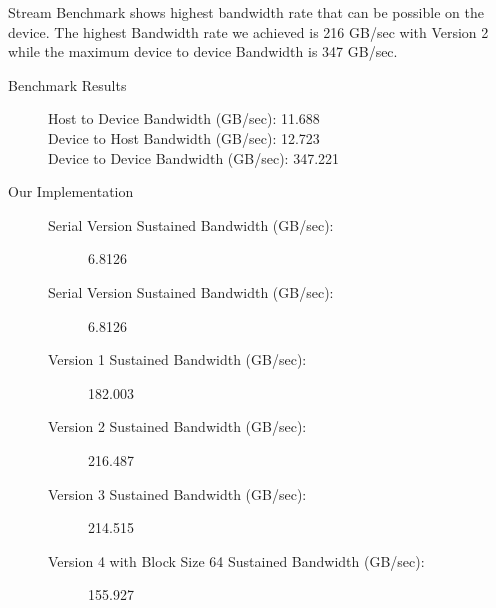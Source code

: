 \documentclass{article}
\newcommand\tab[1][0.5cm]{\hspace*{#1}}
\begin{document}
\tab Stream Benchmark shows highest bandwidth rate that can be possible on the device. 
The highest Bandwidth rate we achieved is 216 GB/sec with Version 2 while the maximum device to device Bandwidth is 347 GB/sec. 

\begin{description}
  \item[Benchmark Results] \hfill
  \begin{description}
    \item [Host to Device Bandwidth (GB/sec): 11.688 ] \hfill
    \item [Device to Host Bandwidth (GB/sec): 12.723 ] \hfill
    \item [Device to Device Bandwidth (GB/sec): 347.221] \hfill
  \end{description}
  \item[Our Implementation]  \hfill
  \begin{description}
    \item[Serial Version Sustained Bandwidth (GB/sec):] 6.8126 \hfill 
    \item[Serial Version Sustained Bandwidth (GB/sec):] 6.8126 \hfill 
    \item[Version 1 Sustained Bandwidth (GB/sec):] 182.003 \hfill 
    \item[Version 2 Sustained Bandwidth (GB/sec):] 216.487\hfill 
    \item[Version 3 Sustained Bandwidth (GB/sec):] 214.515\hfill 
    \item[Version 4 with Block Size 64 Sustained Bandwidth (GB/sec):] 155.927 \hfill 
  \end{description}
\end{description}

\newpage
\end{document}
